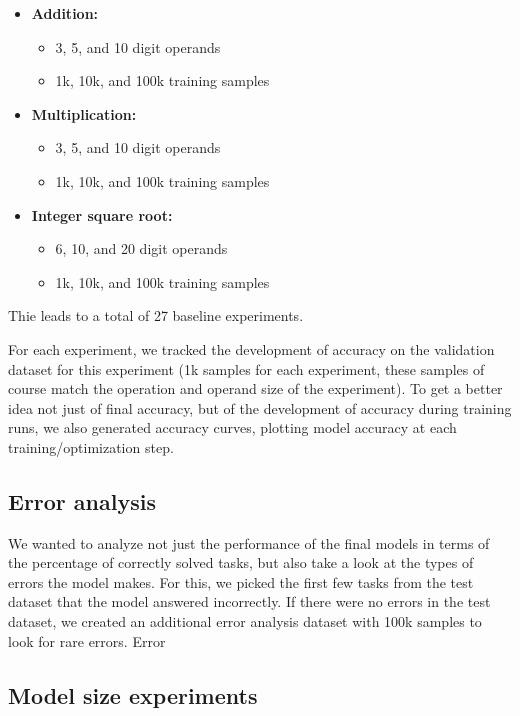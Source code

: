 \begin{itemize}
	\item \textbf{Addition:}
	\begin{itemize}
		\item 3, 5, and 10 digit operands
		\item 1k, 10k, and 100k training samples
	\end{itemize}
	\item \textbf{Multiplication:}
	\begin{itemize}
		\item 3, 5, and 10 digit operands
		\item 1k, 10k, and 100k training samples
	\end{itemize}
	\item \textbf{Integer square root:}
	\begin{itemize}
		\item 6, 10, and 20 digit operands
		\item 1k, 10k, and 100k training samples
	\end{itemize}
\end{itemize}

Thie leads to a total of 27 baseline experiments.

For each experiment, we tracked the development of accuracy on the validation dataset for this experiment (1k samples for each experiment, these samples of course match the operation and operand size of the experiment).
To get a better idea not just of final accuracy, but of the development of accuracy during training runs, we also generated accuracy curves, plotting model accuracy at each training/optimization step.


\subsection{Error analysis}
\label{setup:error}

We wanted to analyze not just the performance of the final models in terms of the percentage of correctly solved tasks, but also take a look at the types of errors the model makes.
For this, we picked the first few tasks from the test dataset that the model answered incorrectly. If there were no errors in the test dataset, we created an additional error analysis dataset with 100k samples to look for rare errors.
Error



\subsection{Model size experiments}
\label{setup:modelsize}

